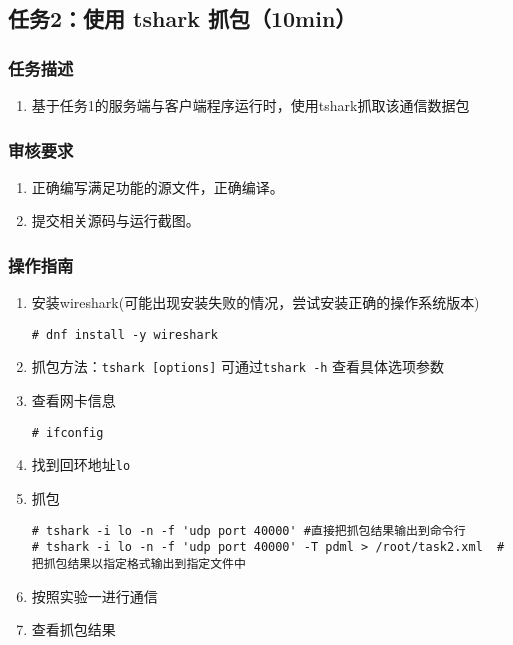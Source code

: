 \documentclass{article}
\begin{document}
\newpage
\subsection{任务2：使用 tshark 抓包（10min）}

\subsubsection{任务描述}
\begin{enumerate}
    \item 基于任务1的服务端与客户端程序运行时，使用tshark抓取该通信数据包
\end{enumerate}

\subsubsection{审核要求}
\begin{enumerate}
    \item 正确编写满足功能的源文件，正确编译。
    \item 提交相关源码与运行截图。
\end{enumerate}

\subsubsection{操作指南}
\begin{enumerate}

\item 安装wireshark(可能出现安装失败的情况，尝试安装正确的操作系统版本)
\begin{lstlisting}
# dnf install -y wireshark
\end{lstlisting}
\item 抓包方法：\verb|tshark [options]| 可通过\verb|tshark -h| 查看具体选项参数
	\item 查看网卡信息
\begin{lstlisting}
# ifconfig
\end{lstlisting}
\item 找到回环地址\verb|lo|
    \item 抓包
\begin{lstlisting}
# tshark -i lo -n -f 'udp port 40000' #直接把抓包结果输出到命令行
# tshark -i lo -n -f 'udp port 40000' -T pdml > /root/task2.xml  #把抓包结果以指定格式输出到指定文件中

\end{lstlisting}
    \item 按照实验一进行通信
    \item 查看抓包结果
\end{enumerate}
\end{document}
